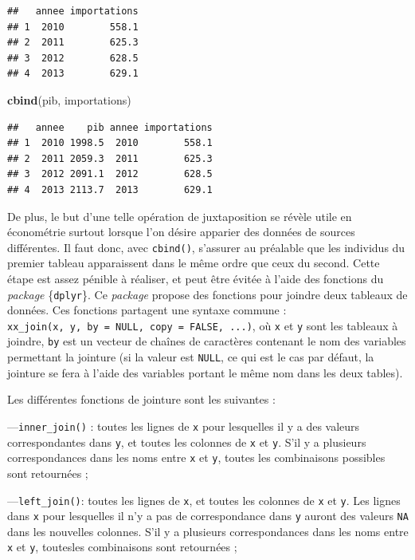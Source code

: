 \documentclass[
  11pt,
]{book}
\newenvironment{Shaded}{\begin{snugshade}}{\end{snugshade}}
\newcommand{\KeywordTok}[1]{\textcolor[rgb]{0.13,0.29,0.53}{\textbf{#1}}}
\newcommand{\NormalTok}[1]{#1}
\numberwithin{equation}{section}
\numberwithin{countremarque}{section}
\begin{document}
\begin{lstlisting}
##   annee importations
## 1  2010        558.1
## 2  2011        625.3
## 3  2012        628.5
## 4  2013        629.1
\end{lstlisting}

\begin{Shaded}
\begin{Highlighting}[]
\KeywordTok{cbind}\NormalTok{(pib, importations)}
\end{Highlighting}
\end{Shaded}

\begin{lstlisting}
##   annee    pib annee importations
## 1  2010 1998.5  2010        558.1
## 2  2011 2059.3  2011        625.3
## 3  2012 2091.1  2012        628.5
## 4  2013 2113.7  2013        629.1
\end{lstlisting}

De plus, le but d'une telle opération de juxtaposition se révèle utile en économétrie surtout lorsque l'on désire apparier des données de sources différentes. Il faut donc, avec \texttt{cbind()}, s'assurer au préalable que les individus du premier tableau apparaissent dans le même ordre que ceux du second. Cette étape est assez pénible à réaliser, et peut être évitée à l'aide des fonctions du \emph{package} \{\texttt{dplyr}\}. Ce \emph{package} propose des fonctions pour joindre deux tableaux de données. Ces fonctions partagent une syntaxe commune : \texttt{xx\_join(x,\ y,\ by\ =\ NULL,\ copy\ =\ FALSE,\ ...)}, où \texttt{x} et \texttt{y} sont les tableaux à joindre, \texttt{by} est un vecteur de chaînes de caractères contenant le nom des variables permettant la jointure (si la valeur est \texttt{NULL}, ce qui est le cas par défaut, la jointure se fera à l'aide des variables portant le même nom dans les deux tables).

Les différentes fonctions de jointure sont les suivantes :

---\texttt{inner\_join()} : toutes les lignes de \texttt{x} pour lesquelles il y a des valeurs correspondantes dans \texttt{y}, et toutes les colonnes de \texttt{x} et \texttt{y}. S'il y a plusieurs correspondances dans les noms entre \texttt{x} et \texttt{y}, toutes les combinaisons possibles sont retournées ;

---\texttt{left\_join()}: toutes les lignes de \texttt{x}, et toutes les colonnes de \texttt{x} et \texttt{y}. Les lignes dans \texttt{x} pour lesquelles il n'y a pas de correspondance dans \texttt{y} auront des valeurs \texttt{NA} dans les nouvelles colonnes. S'il y a plusieurs correspondances dans les noms entre \texttt{x} et \texttt{y}, toutesles combinaisons sont retournées ;
\end{document}
